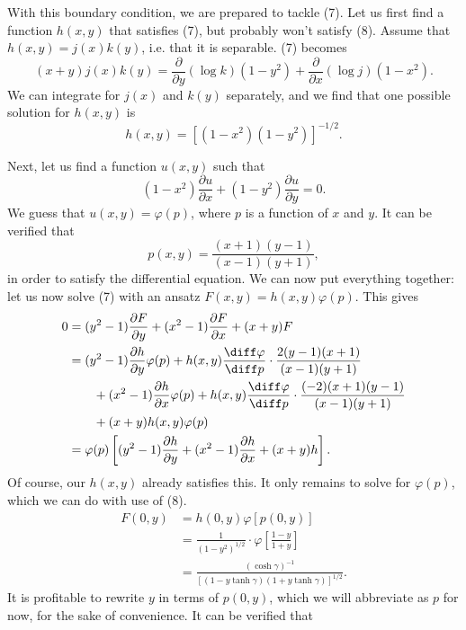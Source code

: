 \documentclass[12pt]{article}
\begin{document}
With this boundary condition, we are prepared to tackle (7).  Let us first find a function $h(x,y)$ that satisfies (7), but probably won't satisfy (8).  Assume that $h(x,y)=j(x)k(y)$, i.e. that it is separable.  (7) becomes
\[
	(x+y) j(x) k(y) = \frac{\partial }{\partial y}(\log k)(1-y^{2}) + \frac{\partial }{\partial x}(\log j)(1-x^2).
\] 
We can integrate for $j(x)$ and $k(y)$ separately, and we find that one possible solution for $h(x,y)$ is
\begin{equation}
	h(x,y) = \left[ (1-x^2) (1-y^2) \right] ^{-1/2}.
\end{equation}

Next, let us find a function $u(x,y)$ such that
\[
	(1-x^2)\frac{\partial u}{\partial x} + (1-y^2)\frac{\partial u}{\partial y} = 0.
\] 
We guess that $u(x,y) = \varphi(p)$, where $p$ is a function of $x$ and $y$.  It can be verified that 
\begin{equation}
	p (x,y) = \frac{(x+1)(y-1)}{(x-1)(y+1)},
\end{equation}
in order to satisfy the differential equation.  We can now put everything together: let us now solve (7) with an ansatz $F(x,y) = h(x,y) \varphi(p)$.  This gives
\begin{align*}
	0 &= (y^2 - 1)\frac{\partial F}{\partial y} + (x^2 - 1)\frac{\partial F}{\partial x} + (x+ y) F \\
	  &= (y^2 - 1)\frac{\partial h}{\partial y}\varphi(p) + h(x,y) \frac{\diff \varphi}{\diff p} \cdot \frac{2(y-1)(x+1)}{(x-1)(y+1)} \\
	  &   \qquad  + (x^2 - 1)\frac{\partial h}{\partial x}\varphi(p) + h(x,y) \frac{\diff \varphi}{\diff p} \cdot \frac{(-2)(x+1)(y-1)}{(x-1)(y+1)} \\
	  & \qquad + (x+y)h(x,y)\varphi(p)  \\
	  &= \varphi(p)\left[ (y^2 -1 )\frac{\partial h}{\partial y} + (x^2 - 1)\frac{\partial h}{\partial x} + (x+y) h \right] .
\end{align*}
Of course, our $h(x,y)$ already satisfies this.  It only remains to solve for $\varphi(p)$, which we can do with use of (8).  
\begin{align*}
	F(0,y) &= h(0,y) \varphi[p(0,y)] \\
	       &= \frac{1}{(1-y^2)^{1/2}} \cdot \varphi \left[ \frac{1-y}{1+y} \right] \\
	       &= \frac{(\cosh \gamma)^{-1}}{\left[ (1-y\tanh \gamma)(1+y\tanh \gamma) \right] ^{1/2}}.
\end{align*}
It is profitable to rewrite $y$ in terms of $p(0,y)$, which we will abbreviate as $p$ for now, for the sake of convenience.  It can be verified that
\end{document}
